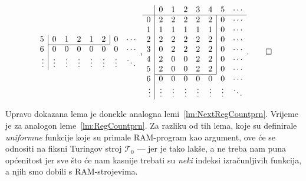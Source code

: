 \begin{primjer}
\begin{equation*}
\begin{array}{r|ccccccc}
5& 0 & 1 & 2 & 1 & 2 & \multicolumn{1}{|c}{0} & \cdots\\ \cline{2-6}
6& 0 & 0 & 0 & 0 & 0 & 0 & \cdots\\
\vdots&\vdots&\vdots&\vdots&\vdots&\vdots&\vdots&\ddots
\end{array}\text,
\begin{array}{r|ccccccc}
    &0&1&2&3&4&5&\cdots\\\hline
0& 2 & 2 & 2 & 2 & 2 & \multicolumn{1}{|c}{0} & \cdots\\
1& 1 & 1 & 1 & 1 & 1 & \multicolumn{1}{|c}{0} & \cdots\\
2& 2 & 2 & 2 & 2 & 2 & \multicolumn{1}{|c}{0} & \cdots\\
3& 0 & 2 & 2 & 2 & 2 & \multicolumn{1}{|c}{0} & \cdots\\
4& 2 & 0 & 0 & 2 & 2 & \multicolumn{1}{|c}{0} & \cdots\\
5& 2 & 0 & 0 & 2 & 2 & \multicolumn{1}{|c}{0} & \cdots\\ \cline{2-6}
6& 0 & 0 & 0 & 0 & 0 & 0 & \cdots\\
\vdots&\vdots&\vdots&\vdots&\vdots&\vdots&\vdots&\ddots
\end{array}\text.\qedhere
\end{equation*}
\end{primjer}


Upravo dokazana lema je donekle analogna lemi~\ref{lm:NextRegCountprn}. Vrijeme je za analogon leme~\ref{lm:RegCountprn}. Za razliku od tih lema, koje su definirale \emph{uniformne} funkcije koje su primale RAM-program kao argument, ove će se odnositi na fiksni Turingov stroj $\mathcal T_0$ --- jer je tako lakše, a ne treba nam puna općenitost jer sve što će nam kasnije trebati su \emph{neki} indeksi izračunljivih funkcija, a njih smo dobili s RAM-strojevima.

